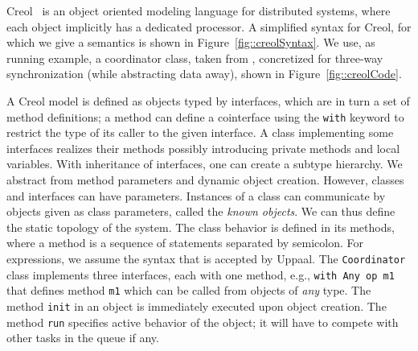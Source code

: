 \documentclass[copyright,creativecommons]{eptcs}
\theoremstyle{definition}
\newcommand{\Uppaal}{{\sc Uppaal}\xspace}
\begin{document}
Creol~\cite{johnsen07sosym} is an object oriented modeling language for distributed systems, where each object implicitly has a dedicated processor.
A simplified syntax for Creol, for which we give a semantics is shown in Figure~\ref{fig::creolSyntax}.
We use, as running example, a coordinator class, taken from \cite{johnsen07sosym}, concretized for three-way synchronization (while abstracting data away), shown in Figure~\ref{fig::creolCode}.

A Creol model is defined as objects typed by interfaces, which are in turn a set of method definitions; a method can define a cointerface using the \lstinline{with} keyword to restrict the type of its caller to the given interface.
A class implementing some interfaces realizes their methods possibly introducing private methods and local variables.
With inheritance of interfaces, one can create a subtype hierarchy.
We abstract from method parameters and dynamic object creation.
However, classes and interfaces can have parameters. Instances of a class can communicate by objects given as class parameters, called the {\em known objects}. We  can thus define the static topology of the system.
The class behavior is defined in its methods, where a method is a sequence of statements separated by semicolon.
For expressions, we assume the syntax that is accepted by \Uppaal.
The \lstinline{Coordinator} class implements three interfaces, each with one method, e.g., \lstinline{with Any op m1} that defines method \lstinline{m1} which can be called from objects of {\em any} type.
The method \lstinline{init} in an object is immediately executed upon object creation.
The method \lstinline{run} specifies active behavior of the object; it will have to compete with other tasks in the queue if any.
\end{document}
